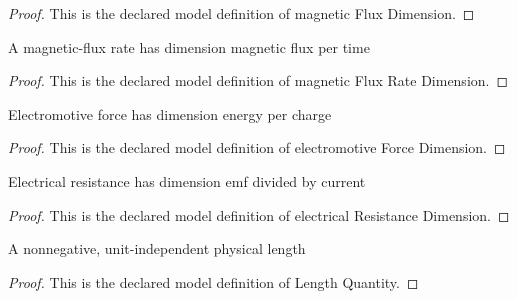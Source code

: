 \begin{proof}
  This is the declared model definition of magnetic Flux Dimension.
\end{proof}
\begin{definition}
  \label{def:physics:phyx-mini-0973:phyxminiproblems-problemphyxmini0973-magneticfluxratedimension}
  A magnetic-flux rate has dimension magnetic flux per time
\end{definition}
\begin{proof}
  This is the declared model definition of magnetic Flux Rate Dimension.
\end{proof}
\begin{definition}
  \label{def:physics:phyx-mini-0973:phyxminiproblems-problemphyxmini0973-electromotiveforcedimension}
  Electromotive force has dimension energy per charge
\end{definition}
\begin{proof}
  This is the declared model definition of electromotive Force Dimension.
\end{proof}
\begin{definition}
  \label{def:physics:phyx-mini-0973:phyxminiproblems-problemphyxmini0973-electricalresistancedimension}
  Electrical resistance has dimension emf divided by current
\end{definition}
\begin{proof}
  This is the declared model definition of electrical Resistance Dimension.
\end{proof}
\begin{definition}
  \label{def:physics:phyx-mini-0973:phyxminiproblems-problemphyxmini0973-lengthquantity}
  A nonnegative, unit-independent physical length
\end{definition}
\begin{proof}
  This is the declared model definition of Length Quantity.
\end{proof}
